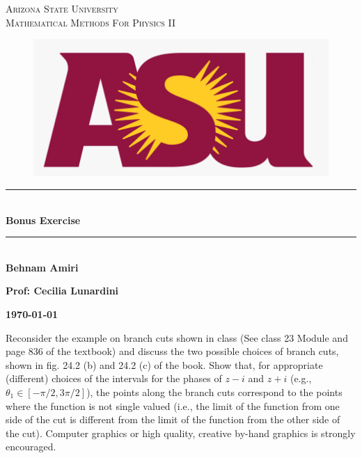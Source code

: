 \documentclass[fleqn]{article}
\begin{document}
  \begin{titlepage}

    \newcommand{\HRule}{\rule{\linewidth}{0.5mm}}

    \center 


    \textsc{\LARGE Arizona State University}\\[1.5cm]

    \textsc{\LARGE Mathematical Methods For Physics II }\\[1.5cm]


    \begin{figure}
      \includegraphics[width=\linewidth]{asu.png}
    \end{figure}


    \HRule \\[0.4cm]
    { \huge \bfseries Bonus Exercise}\\[0.4cm] 
    \HRule \\[1.5cm]

    \textbf{Behnam Amiri}

    \bigbreak

    \textbf{Prof: Cecilia Lunardini}

    \bigbreak


    \textbf{{\large \today}\\[2cm]}

    \vfill

  \end{titlepage}

    Reconsider the example on branch cuts shown in class 
    (See class 23 Module and page 836 of the textbook) and discuss the two possible choices of branch cuts, shown in fig. 
    24.2 (b) and 24.2 (c) of the book. Show that, for appropriate (different) choices of the intervals for the phases 
    of $z-i$ and $z+i$ (e.g., $\theta_1 \in [ -\pi/2 , 3 \pi/2]$), the points along the branch cuts correspond to the 
    points where the function is not single valued (i.e., the limit of the function from one side of the cut is different 
    from the limit of the function from the other side of the cut). Computer graphics or high quality, creative by-hand graphics is strongly encouraged. 
\end{document}
